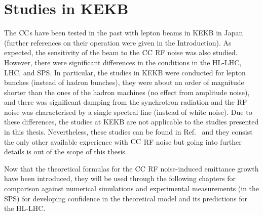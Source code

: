 \section{Studies in KEKB}\label{eq:past_studies_KEKB}
The ${\mathrm{CC}}$s have been tested in the past with lepton beams in KEKB in Japan (further references on their operation were given in the Introduction). %
As expected, the sensitivity of the beam to the ${\mathrm{CC}}$ RF noise was also studied. However, there were significant differences in the conditions in the HL-LHC, LHC, and SPS. In particular, the studies in KEKB were conducted for lepton bunches (instead of hadron bunches), they were about an order of magnitude shorter than the ones of the hadron machines (no effect from amplitude noise), and there was significant damping from the synchrotron radiation and the RF noise was characterised by a single spectral line (instead of white noise). Due to these differences, the studies at KEKB are not applicable to the studies presented in this thesis. Nevertheless, these studies can be found in Ref.~\cite{PhysRevSTAB.14.111003} and they consist the only other available experience with ${\mathrm{CC}}$ RF noise but going into further details is out of the scope of this thesis.

Now that the theoretical formulas for the ${\mathrm{CC}}$ RF noise-induced emittance growth have been introduced, they will be used through the following chapters for comparison against numerical simulations and experimental measurements (in the SPS) for developing confidence in the theoretical model and its predictions for the HL-LHC.
